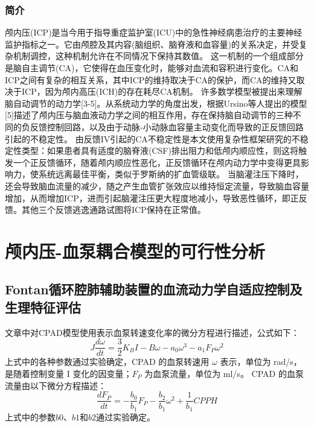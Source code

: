 \documentclass[titlepage,12pt]{article}
\begin{document}
\subsubsection{简介}
颅内压(ICP)是当今用于指导重症监护室(ICU)中的急性神经病患治疗的主要神经监护指标之一。它由颅腔及其内容(脑组织、脑脊液和血容量)的关系决定，并受复杂机制调控，这种机制允许在不同情况下保持其数值。
这一机制的一个组成部分是脑自主调节(CA)，它使得在血压变化时，能够对血流和容积进行变化。CA和ICP之间有复杂的相互关系，其中ICP的维持取决于CA的保护，而CA的维持又取决于ICP，因为颅内高压(ICH)的存在耗尽CA机制。
许多数学模型被提出来理解脑自动调节的动力学[3-5]。从系统动力学的角度出发，根据Ursino等人提出的模型[5]描述了颅内压与脑血液动力学之间的相互作用，存在保持脑自动调节的三种不同的负反馈控制回路，以及由于动脉-小动脉血容量主动变化而导致的正反馈回路引起的不稳定性。
由反馈IV引起的CA不稳定性是本文使用复杂性框架研究的不稳定性类型：如果患者具有适度的脑脊液(CSF)排出阻力和低颅内顺应性，则这将触发一个正反馈循环，随着颅内顺应性恶化，正反馈循环在颅内动力学中变得更具影响力，使系统远离最佳平衡，类似于罗斯纳的扩血管级联。
当脑灌注压下降时，还会导致脑血流量的减少，随之产生血管扩张效应以维持恒定流量，导致脑血容量增加，从而增加ICP，进而引起脑灌注压更大程度地减小，导致恶性循环，即正反馈。其他三个反馈逃逸通路试图将ICP保持在正常值。

\section{颅内压-血泵耦合模型的可行性分析}
\subsection{Fontan循环腔肺辅助装置的血流动力学自适应控制及生理特征评估}
文章中对CPAD模型使用表示血泵转速变化率的微分方程进行描述，公式如下：
\begin{equation*}
    J \frac{d\omega}{dt} = \frac{3}{2} K_B I - B \omega - a_0 \omega^3 - a_1 F_P \omega^2
\end{equation*}
上式中的各种参数通过实验确定，CPAD 的血泵转速用 $\omega$ 表示，单位为 rad/s，是随着控制变量 I 变化的因变量；$F_P$ 为血泵流量，单位为 ml/s。
CPAD 的血泵流量由以下微分方程描述：
\begin{equation*}
    \frac{dF_P}{dt} = -\frac{b_0}{b_1} F_P - \frac{b_2}{b_1} \omega^2 + \frac{1}{b_1} CPPH
\end{equation*}
上式中的参数$b0$、$b1$和$b2$通过实验确定。
\end{document}
